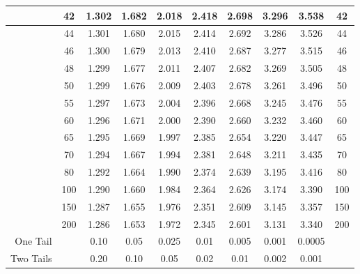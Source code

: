 \begin{table}[H]
\begin{center}
{\begin{tabular}{|r|c|c|c|c|c|c|c|c|c|}
\hline    &42 &   1.302 &  1.682 &  2.018 &  2.418 &  2.698 &  3.296 &  3.538 &  42  \\
\hline    &44 &   1.301 &  1.680 &  2.015 &  2.414 &  2.692 &  3.286 &  3.526 &  44  \\
\hline    &46 &   1.300 &  1.679 &  2.013 &  2.410 &  2.687 &  3.277 &  3.515 &  46  \\
\hline    &48 &   1.299 &  1.677 &  2.011 &  2.407 &  2.682 &  3.269 &  3.505 &  48  \\
\hline    &50 &   1.299 &  1.676 &  2.009 &  2.403 &  2.678 &  3.261 &  3.496 &  50 \\
\hline    &55 &   1.297 &  1.673 &  2.004 &  2.396 &  2.668 &  3.245 &  3.476 &  55  \\
\hline    &60 &   1.296 &  1.671 &  2.000 &  2.390 &  2.660 &  3.232 &  3.460 &  60  \\
\hline    &65 &   1.295 &  1.669 &  1.997 &  2.385 &  2.654 &  3.220 &  3.447 &  65  \\
\hline    &70 &   1.294 &  1.667 &  1.994 &  2.381 &  2.648 &  3.211 &  3.435 &  70  \\
\hline    &80 &   1.292 &  1.664 &  1.990 &  2.374 &  2.639 &  3.195 &  3.416 &  80  \\
\hline   &100 &   1.290 &  1.660 &  1.984 &  2.364 &  2.626 &  3.174 &  3.390 & 100  \\  
\hline   &150 &   1.287 &  1.655 &  1.976 &  2.351 &  2.609 &  3.145 &  3.357 & 150  \\
\hline   &200 &   1.286 &  1.653 &  1.972 &  2.345 &  2.601 &  3.131 &  3.340 & 200 \\
\hline One Tail& & 0.10 & 0.05 & 0.025 & 0.01 & 0.005 & 0.001 & 0.0005 &\\ 
\hline Two Tails& & 0.20 &   0.10 &   0.05 &   0.02  &  0.01  &  0.002 & 0.001 & \\ 
\hline 
\end{tabular} }
\end{center}
\end{table}

\cleardoublepage